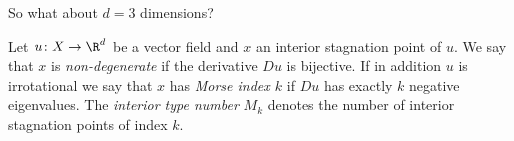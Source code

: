 {
\begin{frame}[plain]
	\begin{center}
    \Large{{So what about $d=3$ dimensions?}}
	\end{center}
\end{frame}
}

\begin{frame}
  \begin{definition}
    Let $u\colon X\to\R^d$ be a vector field and $x$ an interior stagnation point of $u$.
    We say that $x$ is \emph{non-degenerate} if the derivative $Du$ is bijective.
    If in addition $u$ is irrotational we say that $x$ has \emph{Morse index $k$} if $Du$ has exactly $k$ negative eigenvalues.
    The \emph{interior type number} $M_k$ denotes the number of interior stagnation points of index $k$.
  \end{definition}
\end{frame}

